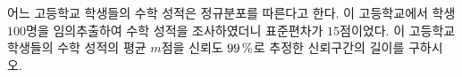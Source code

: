어느 고등학교 학생들의 수학 성적은 정규분포를 따른다고 한다. 이 고등학교에서 학생 $100$명을 임의추출하여 수학 성적을 조사하였더니 표준편차가 $15$점이었다. 이 고등학교 학생들의 수학 성적의 평균 $m$점을 신뢰도 $99\mkern3mu \%$로 추정한 신뢰구간의 길이를 구하시오. 

